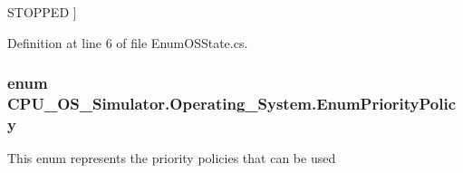 \begin{Desc}
\begin{description}
{\hypertarget{namespace_c_p_u___o_s___simulator_1_1_operating___system_a03a98a403abc737c106a8f92db5bffc1a09d4d696b4e935115b9313e3c412509a}{}S\+T\+O\+P\+P\+E\+D\label{namespace_c_p_u___o_s___simulator_1_1_operating___system_a03a98a403abc737c106a8f92db5bffc1a09d4d696b4e935115b9313e3c412509a}
}]\item[{\em 
\hypertarget{namespace_c_p_u___o_s___simulator_1_1_operating___system_a03a98a403abc737c106a8f92db5bffc1a0550134156d1220fe47b905f3da1080f}{}D\+E\+A\+D\+L\+O\+C\+K\+E\+D\label{namespace_c_p_u___o_s___simulator_1_1_operating___system_a03a98a403abc737c106a8f92db5bffc1a0550134156d1220fe47b905f3da1080f}
}]\end{description}
\end{Desc}


Definition at line 6 of file Enum\+O\+S\+State.\+cs.

\hypertarget{namespace_c_p_u___o_s___simulator_1_1_operating___system_a3a9286a473bd079e9c65908c0378fa00}{}
\subsubsection[{Enum\+Priority\+Policy}]{\setlength{\rightskip}{0pt plus 5cm}enum {\bf C\+P\+U\+\_\+\+O\+S\+\_\+\+Simulator.\+Operating\+\_\+\+System.\+Enum\+Priority\+Policy}\hspace{0.3cm}{\ttfamily [strong]}}\label{namespace_c_p_u___o_s___simulator_1_1_operating___system_a3a9286a473bd079e9c65908c0378fa00}


This enum represents the priority policies that can be used 

